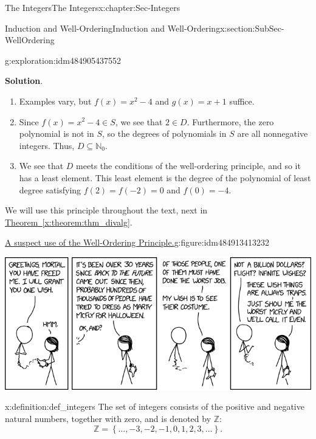 \documentclass[oneside,10pt,]{book}
\newcommand{\blocktitlefont}{\relax}
\newcommand{\xreffont}{\relax}
\numberwithin{equation}{section}
\newcommand{\set}[1]{\left\{ {#1} \right\}}
\def\Z{{\mathbb Z}}
\def\N{{\mathbb N}}
\begin{document}
\begin{chapterptx}{The Integers}{}{The Integers}{}{}{x:chapter:Sec-Integers}
\begin{sectionptx}{Induction and Well-Ordering}{}{Induction and Well-Ordering}{}{}{x:section:SubSec-WellOrdering}
\begin{exploration}{}{g:exploration:idm484905437552}
\begin{enumerate}
\end{enumerate}
\par\smallskip%
\noindent\textbf{\blocktitlefont Solution}.\hypertarget{g:solution:idm484914284768}{}\quad{}%
\begin{enumerate}
\item{}Examples vary, but \(f(x) = x^2-4\) and \(g(x) = x+1\) suffice.%
\item{}Since \(f(x) = x^2 - 4\in S\), we see that \(2\in D\). Furthermore, the zero polynomial is not in \(S\), so the degrees of polynomials in \(S\) are all nonnegative integers. Thus, \(D\subseteq \N_0\).%
\item{}We see that \(D\) meets the conditions of the well-ordering principle, and so it has a least element. This least element is the degree of the polynomial of least degree satisfying \(f(2) = f(-2) = 0\) and \(f(0) = -4\).%
\end{enumerate}
\end{exploration}
We will use this principle throughout the text, next in \hyperref[x:theorem:thm_divalg]{Theorem~{\xreffont\ref{x:theorem:thm_divalg}}}.%
\begin{figureptx}{\href{https://www.xkcd.com/2193/}{A suspect use of the Well-Ordering Principle.}}{g:figure:idm484913413232}{}%
\begin{image}{0.175}{0.65}{0.175}%
\includegraphics[width=\linewidth]{../images/well_ordering_principle.png}
\end{image}%
\tcblower
\end{figureptx}%
\begin{definition}{}{x:definition:def_integers}%
\index{\(\Z\)} The set of integers consists of the positive and negative natural numbers, together with zero, and is denoted by \(\Z\):%
\begin{equation*}
\Z = \set{\ldots, -3, -2, -1, 0, 1, 2, 3, \ldots}\text{.}
\end{equation*}
%
\end{definition}

\end{sectionptx}
\end{chapterptx}
\end{document}
